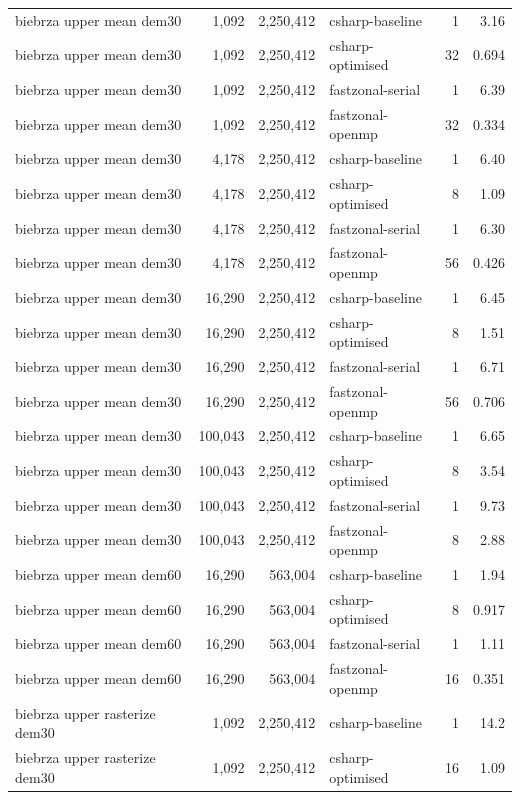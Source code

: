 \begin{tabular}{lrrlrr}
biebrza upper mean dem30 & 1,092 & 2,250,412 & csharp-baseline & 1 & 3.16 \\
biebrza upper mean dem30 & 1,092 & 2,250,412 & csharp-optimised & 32 & 0.694 \\
biebrza upper mean dem30 & 1,092 & 2,250,412 & fastzonal-serial & 1 & 6.39 \\
biebrza upper mean dem30 & 1,092 & 2,250,412 & fastzonal-openmp & 32 & 0.334 \\
biebrza upper mean dem30 & 4,178 & 2,250,412 & csharp-baseline & 1 & 6.40 \\
biebrza upper mean dem30 & 4,178 & 2,250,412 & csharp-optimised & 8 & 1.09 \\
biebrza upper mean dem30 & 4,178 & 2,250,412 & fastzonal-serial & 1 & 6.30 \\
biebrza upper mean dem30 & 4,178 & 2,250,412 & fastzonal-openmp & 56 & 0.426 \\
biebrza upper mean dem30 & 16,290 & 2,250,412 & csharp-baseline & 1 & 6.45 \\
biebrza upper mean dem30 & 16,290 & 2,250,412 & csharp-optimised & 8 & 1.51 \\
biebrza upper mean dem30 & 16,290 & 2,250,412 & fastzonal-serial & 1 & 6.71 \\
biebrza upper mean dem30 & 16,290 & 2,250,412 & fastzonal-openmp & 56 & 0.706 \\
biebrza upper mean dem30 & 100,043 & 2,250,412 & csharp-baseline & 1 & 6.65 \\
biebrza upper mean dem30 & 100,043 & 2,250,412 & csharp-optimised & 8 & 3.54 \\
biebrza upper mean dem30 & 100,043 & 2,250,412 & fastzonal-serial & 1 & 9.73 \\
biebrza upper mean dem30 & 100,043 & 2,250,412 & fastzonal-openmp & 8 & 2.88 \\
biebrza upper mean dem60 & 16,290 & 563,004 & csharp-baseline & 1 & 1.94 \\
biebrza upper mean dem60 & 16,290 & 563,004 & csharp-optimised & 8 & 0.917 \\
biebrza upper mean dem60 & 16,290 & 563,004 & fastzonal-serial & 1 & 1.11 \\
biebrza upper mean dem60 & 16,290 & 563,004 & fastzonal-openmp & 16 & 0.351 \\
biebrza upper rasterize dem30 & 1,092 & 2,250,412 & csharp-baseline & 1 & 14.2 \\
biebrza upper rasterize dem30 & 1,092 & 2,250,412 & csharp-optimised & 16 & 1.09 \\

\end{tabular}
